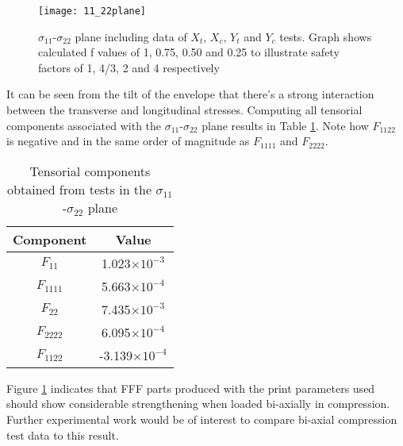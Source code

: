 \documentclass[main.tex]{subfiles}
\begin{document}
\begin{figure}[!htbp]
	\center
	\texttt{[image: 11\_22plane]}
	\captionsetup{justification=centering} %
	\caption[failure envelope in the $\sigma_{11}$-$\sigma_{22}$ plane]{$\sigma_{11}$-$\sigma_{22}$ plane including data of $X_t$, $X_c$, $Y_t$ and $Y_c$ tests. Graph shows calculated f values of 1, 0.75, 0.50 and 0.25 to illustrate safety factors of 1, 4/3, 2 and 4 respectively} \label{fig:1122plane}
\end{figure}

It can be seen from the tilt of the envelope that there's a strong interaction between the transverse and longitudinal stresses. Computing all tensorial components associated with the  $\sigma_{11}$-$\sigma_{22}$ plane results in Table \ref{tab:1122calc}. Note how $F_{1122}$ is negative and in the same order of magnitude as $F_{1111}$ and $F_{2222}$. 

\begin{table} [h]
	\centering
	\caption{Tensorial components obtained from tests in the $\sigma_{11}$-$\sigma_{22}$ plane}
	\begin{tabular}{ c c } 
		\toprule
		\textbf{Component} & \textbf{Value} \\
		\midrule
		$F_{11}$ & 1.023$\times 10^{-3}$\\ [1ex]
		$F_{1111}$ & 5.663$\times 10^{-4}$\\ [1ex]
		$F_{22}$ & 7.435$\times 10^{-3}$\\ [1ex]
		$F_{2222}$ & 6.095$\times 10^{-4}$\\ [1ex]
		$F_{1122}$ & -3.139$\times 10^{-4}$\\ [1ex]
		\bottomrule
	\end{tabular}
	\label{tab:1122calc}
\end{table}  

Figure \ref{fig:1122plane} indicates that FFF parts produced with the print parameters used should show considerable strengthening when loaded bi-axially in compression. Further experimental work would be of interest to compare bi-axial compression test data to this result.
% 

\end{document}
